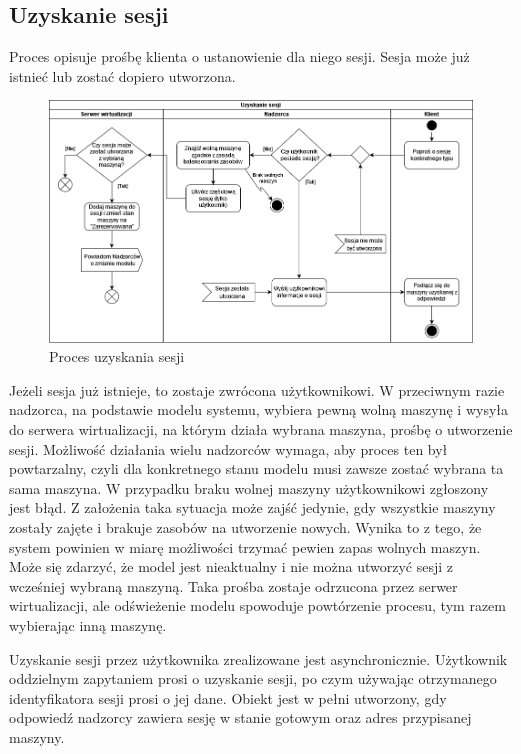 \documentclass[../opis-rozwiazania.tex]{subfiles}
\begin{document}
\label{diagrams:activity_diagrams}

\subsection{Uzyskanie sesji}

Proces opisuje prośbę klienta o ustanowienie dla niego sesji. Sesja może już istnieć lub zostać dopiero utworzona.

\begin{figure}[H]
  \centering
  \includegraphics[width=\textwidth]{../diagrams/activity_diagrams/uzyskanie_sesji_v2.png}
  \caption{Proces uzyskania sesji}
  \label{start_session}
\end{figure}

Jeżeli sesja już istnieje, to zostaje zwrócona użytkownikowi.
W przeciwnym razie nadzorca, na podstawie modelu systemu, wybiera pewną wolną maszynę i wysyła do serwera wirtualizacji, na którym działa wybrana maszyna, prośbę o utworzenie sesji. Możliwość działania wielu nadzorców wymaga, aby proces ten był powtarzalny, czyli dla konkretnego stanu modelu musi zawsze zostać wybrana ta sama maszyna.
W przypadku braku wolnej maszyny użytkownikowi zgłoszony jest błąd.
Z założenia taka sytuacja może zajść jedynie, gdy wszystkie maszyny zostały zajęte i brakuje zasobów na utworzenie nowych. Wynika to z tego, że system powinien w miarę możliwości trzymać pewien zapas wolnych maszyn.
Może się zdarzyć, że model jest nieaktualny i nie można utworzyć sesji z wcześniej wybraną maszyną.
Taka prośba zostaje odrzucona przez serwer wirtualizacji, ale odświeżenie modelu spowoduje powtórzenie procesu, tym razem wybierając inną maszynę.

Uzyskanie sesji przez użytkownika zrealizowane jest asynchronicznie.
Użytkownik oddzielnym zapytaniem prosi o uzyskanie sesji, po czym używając otrzymanego identyfikatora sesji prosi o jej dane.
Obiekt jest w pełni utworzony, gdy odpowiedź nadzorcy zawiera sesję w stanie gotowym oraz adres przypisanej maszyny.
\end{document}
